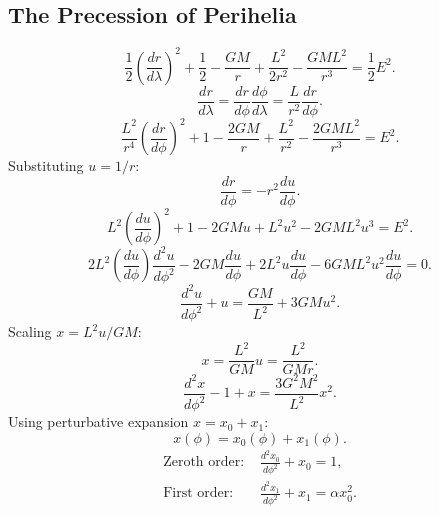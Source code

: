 \documentclass[11pt, a4paper]{report}
\begin{document}
\subsection{The Precession of Perihelia}
\begin{equation}
\label{eq:radial_energy_massive}
\frac{1}{2}\left(\frac{dr}{d\lambda}\right)^{2} + \frac{1}{2} - \frac{GM}{r} + \frac{L^{2}}{2r^{2}} - \frac{GML^{2}}{r^{3}} = \frac{1}{2}E^{2}.
\end{equation}
\begin{equation}
\frac{dr}{d\lambda} = \frac{dr}{d\phi}\frac{d\phi}{d\lambda} = \frac{L}{r^{2}}\frac{dr}{d\phi}.
\end{equation}
\begin{equation}
\frac{L^{2}}{r^{4}}\left(\frac{dr}{d\phi}\right)^{2} + 1 - \frac{2GM}{r} + \frac{L^{2}}{r^{2}} - \frac{2GML^{2}}{r^{3}} = E^{2}.
\end{equation}
Substituting $u = 1/r$:
\begin{equation}
\frac{dr}{d\phi} = -r^{2}\frac{du}{d\phi}.
\end{equation}
\begin{equation}
L^{2}\left(\frac{du}{d\phi}\right)^{2} + 1 - 2GMu + L^{2}u^{2} - 2GML^{2}u^{3} = E^{2}.
\end{equation}
\begin{equation}
2L^{2}\left(\frac{du}{d\phi}\right)\frac{d^{2}u}{d\phi^{2}} - 2GM\frac{du}{d\phi} + 2L^{2}u\frac{du}{d\phi} - 6GML^{2}u^{2}\frac{du}{d\phi} = 0.
\end{equation}
\begin{equation}
\frac{d^{2}u}{d\phi^{2}} + u = \frac{GM}{L^{2}} + 3GMu^{2}.
\end{equation}
Scaling $x = L^2 u / GM$:
\begin{equation}
x = \frac{L^{2}}{GM}u = \frac{L^{2}}{GMr}.
\end{equation}
\begin{equation}
\label{eq:perihelion_ode}
\frac{d^{2}x}{d\phi^{2}} - 1 + x = \frac{3G^{2}M^{2}}{L^{2}}x^{2}.
\end{equation}
Using perturbative expansion $x = x_0 + x_1$:
\begin{equation}
x(\phi) = x_{0}(\phi) + x_{1}(\phi).
\end{equation}
\begin{align}
\text{Zeroth order: } & \frac{d^{2}x_{0}}{d\phi^{2}} + x_{0} = 1, \label{eq:zero_order} \\
\text{First order: } & \frac{d^{2}x_{1}}{d\phi^{2}} + x_{1} = \alpha x_{0}^{2}. \label{eq:first_order}
\end{align}
\end{document}
